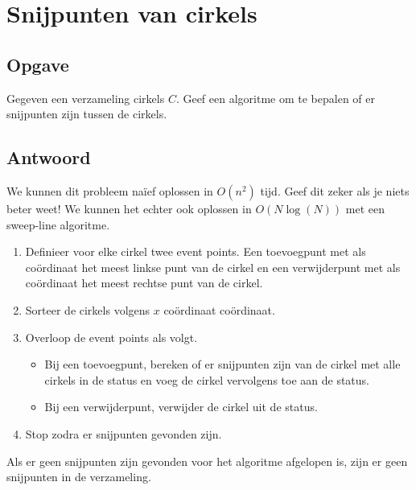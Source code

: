 \documentclass[examenvragen.tex]{subfiles}
\begin{document}
\section{Snijpunten van cirkels}
\subsection{Opgave}
Gegeven een verzameling cirkels $C$. Geef een algoritme om te bepalen of er snijpunten zijn tussen de cirkels.

\subsection{Antwoord}
We kunnen dit probleem na\"ief oplossen in $O(n^2)$ tijd. Geef dit zeker als je niets beter weet! We kunnen het echter ook oplossen in $O(N\log(N))$ met een sweep-line algoritme.

\begin{enumerate}
\item Definieer voor elke cirkel twee event points. Een toevoegpunt met als co\"ordinaat het meest linkse punt van de cirkel en een verwijderpunt met als co\"ordinaat het meest rechtse punt van de cirkel.
\item Sorteer de cirkels volgens $x$ co\"ordinaat co\"ordinaat.
\item Overloop de event points als volgt.
\begin{itemize}
\item Bij een toevoegpunt, bereken of er snijpunten zijn van de cirkel met alle cirkels in de status en voeg de cirkel vervolgens toe aan de status.
\item Bij een verwijderpunt, verwijder de cirkel uit de status.
\end{itemize}
\item Stop zodra er snijpunten gevonden zijn.
\end{enumerate}
Als er geen snijpunten zijn gevonden voor het algoritme afgelopen is, zijn er geen snijpunten in de verzameling.
\end{document}
